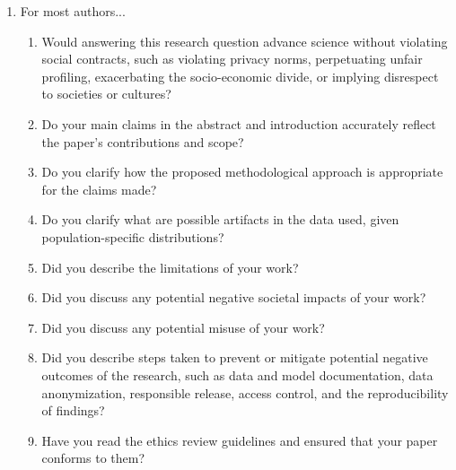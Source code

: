\begin{enumerate}
\item For most authors...
\begin{enumerate}
    \item  Would answering this research question advance science without violating social contracts, such as violating privacy norms, perpetuating unfair profiling, exacerbating the socio-economic divide, or implying disrespect to societies or cultures?
  \item Do your main claims in the abstract and introduction accurately reflect the paper's contributions and scope?
   \item Do you clarify how the proposed methodological approach is appropriate for the claims made? 
   \item Do you clarify what are possible artifacts in the data used, given population-specific distributions?
  \item Did you describe the limitations of your work?
  \item Did you discuss any potential negative societal impacts of your work?
      \item Did you discuss any potential misuse of your work?
    \item Did you describe steps taken to prevent or mitigate potential negative outcomes of the research, such as data and model documentation, data anonymization, responsible release, access control, and the reproducibility of findings?
  \item Have you read the ethics review guidelines and ensured that your paper conforms to them?
\end{enumerate}


\end{enumerate}
